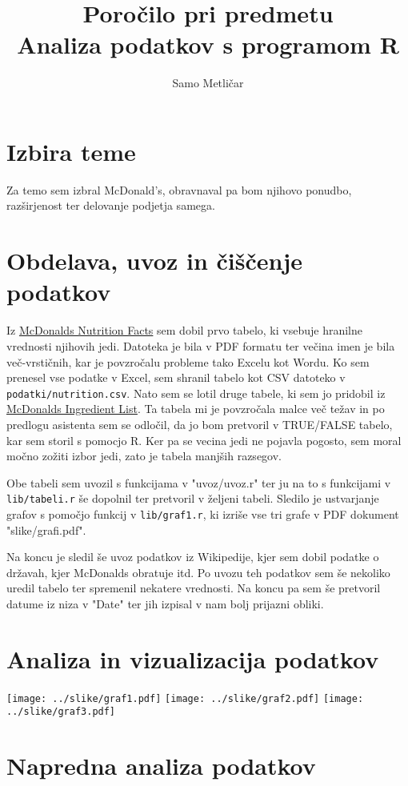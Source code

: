 \documentclass[11pt,a4paper]{article}
\begin{document}
\title{Poročilo pri predmetu \\
Analiza podatkov s programom R}
\author{Samo Metličar}
\maketitle

\section{Izbira teme}

Za temo sem izbral McDonald's, obravnaval pa bom njihovo ponudbo, razširjenost ter delovanje podjetja samega.

\section{Obdelava, uvoz in čiščenje podatkov}

Iz \href{http://nutrition.mcdonalds.com/getnutrition/nutritionfacts.pdf}{McDonalds Nutrition Facts} sem dobil prvo tabelo, ki vsebuje hranilne vrednosti njihovih jedi. Datoteka je bila v PDF formatu ter večina imen je bila več-vrstičnih, kar je povzročalu probleme tako Excelu kot Wordu. Ko sem prenesel vse podatke v Excel, sem shranil tabelo kot CSV datoteko v \verb|podatki/nutrition.csv|. Nato sem se lotil druge tabele, ki sem jo pridobil iz \href{http://nutrition.mcdonalds.com/getnutrition/ingredientslist.pdf}{McDonalds Ingredient List}. Ta tabela mi je povzročala malce več težav in po predlogu asistenta sem se odločil, da jo bom pretvoril v TRUE/FALSE tabelo, kar sem storil s pomocjo R. Ker pa se vecina jedi ne pojavla pogosto, sem moral močno zožiti izbor jedi, zato je tabela manjših razsegov. \par

Obe tabeli sem uvozil s funkcijama v "uvoz/uvoz.r" ter ju na to s funkcijami v \verb|lib/tabeli.r| še dopolnil ter pretvoril v željeni tabeli. Sledilo je ustvarjanje grafov s pomočjo funkcij v \verb|lib/graf1.r|, ki izriše vse tri grafe v PDF dokument "slike/grafi.pdf". \par

Na koncu je sledil še uvoz podatkov iz Wikipedije, kjer sem dobil podatke o državah, kjer McDonalds obratuje itd. Po uvozu teh podatkov sem še nekoliko uredil tabelo ter spremenil nekatere vrednosti. Na koncu pa sem še pretvoril datume iz niza v "Date" ter jih izpisal v nam bolj prijazni obliki.

\section{Analiza in vizualizacija podatkov}

\texttt{[image: ../slike/graf1.pdf]}
\texttt{[image: ../slike/graf2.pdf]}
\texttt{[image: ../slike/graf3.pdf]}

\section{Napredna analiza podatkov}
\end{document}
